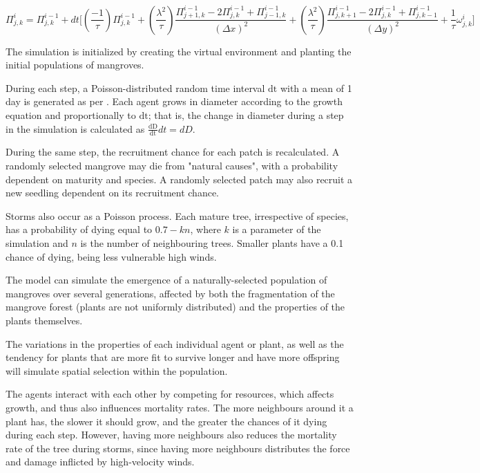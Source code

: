 \begin{dmath}
\Pi_{j,k}^{i} = \Pi_{j,k}^{i - 1} + dt\lbrack(\frac{- 1}{\tau})\Pi_{j,k}^{i - 1} + (\frac{\lambda^{2}}{\tau})\frac{\Pi_{j + 1,k}^{i - 1} - 2\Pi_{j,k}^{i - 1} + \Pi_{j - 1,k}^{i - 1}}{{(\Delta x)}^{2}} + (\frac{\lambda^{2}}{\tau})\frac{\Pi_{j,k + 1}^{i - 1} - 2\Pi_{j,k}^{i - 1} + \Pi_{j,k - 1}^{i - 1}}{{(\Delta y)}^{2}} + \frac{1}{\tau}\omega_{j,k}^{i}\rbrack
\end{dmath}

The simulation is initialized by creating the virtual environment and planting the initial populations of mangroves.

During each step, a Poisson-distributed random time interval \(\text{dt}\) with a mean of 1 day is generated as per \cite{SalmoJuanico2015}. Each
agent grows in diameter according to the growth equation and
proportionally to \(\text{dt}\); that is, the change in diameter during a
step in the simulation is calculated as \(\frac{\text{dD}}{\text{dt}}dt = dD\).

During the same step, the recruitment chance for each patch is
recalculated. A randomly selected mangrove may die from "natural
causes", with a probability dependent on maturity and species. A randomly
selected patch may also recruit a new seedling dependent on its
recruitment chance.

Storms also occur as a Poisson process. Each mature tree, irrespective
of species, has a probability of dying equal to \(0.7 - kn\),
where \(k\) is a parameter of the simulation and \(n\) is the number of
neighbouring trees. Smaller plants have a 0.1 chance of dying, being less vulnerable
high winds.

The model can simulate the emergence of a naturally-selected population
of mangroves over several generations, affected by both the
fragmentation of the mangrove forest (plants are not uniformly
distributed) and the properties of the plants themselves. 

The variations in the properties of each individual agent or plant, as
well as the tendency for plants that are more fit to survive longer and
have more offspring will simulate spatial selection within the
population.

The agents interact with each other by competing for resources, which
affects growth, and thus also influences mortality rates. The more
neighbours around it a plant has, the slower it should grow, and the
greater the chances of it dying during each step. However, having more
neighbours also reduces the mortality rate of the tree during storms,
since having more neighbours distributes the force and damage inflicted
by high-velocity winds.